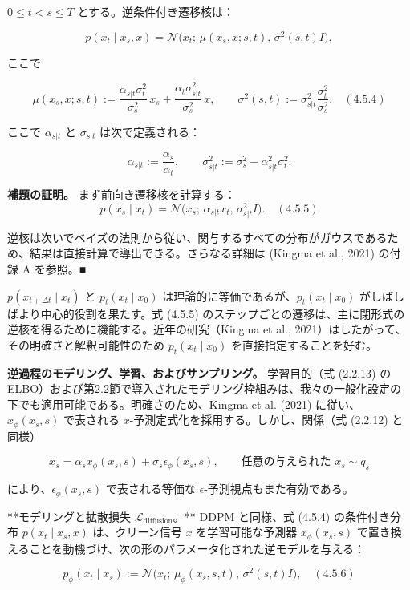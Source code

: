 \begin{propositionbox}[補題 4.5.2: 逆条件付き遷移核]
$0\le t<s\le T$ とする。逆条件付き遷移核は：

\[
p(x_t\mid x_s,x)=\mathcal{N}\bigl(x_t;\, \mu(x_s,x;s,t),\, \sigma^2(s,t)I\bigr),
\]

ここで

\[
\mu(x_s,x;s,t)
:=\frac{\alpha_{s|t}\sigma_t^2}{\sigma_s^2}\, x_s
+ \frac{\alpha_t\sigma_{s|t}^2}{\sigma_s^2}\, x, \qquad
\sigma^2(s,t):=\sigma_{s|t}^2\frac{\sigma_t^2}{\sigma_s^2}. \quad (4.5.4)
\]

ここで $\alpha_{s|t}$ と $\sigma_{s|t}$ は次で定義される：

\[
\alpha_{s|t}:=\frac{\alpha_s}{\alpha_t}, \qquad
\sigma_{s|t}^2:=\sigma_s^2-\alpha_{s|t}^2\sigma_t^2.
\]
\end{propositionbox}


\textbf{補題の証明。}
まず前向き遷移核を計算する：
\[
p(x_s\mid x_t)=\mathcal{N}\bigl(x_s;\, \alpha_{s|t}x_t,\, \sigma_{s|t}^2 I\bigr). \quad (4.5.5)
\]

逆核は次いでベイズの法則から従い、関与するすべての分布がガウスであるため、結果は直接計算で導出できる。さらなる詳細は (Kingma et al., 2021) の付録 A を参照。■

$p(x_{t+\Delta t}\mid x_t)$ と $p_t(x_t\mid x_0)$ は理論的に等価であるが、$p_t(x_t\mid x_0)$ がしばしばより中心的役割を果たす。式 (4.5.5) のステップごとの遷移は、主に閉形式の逆核を得るために機能する。近年の研究（Kingma et al., 2021）はしたがって、その明確さと解釈可能性のため $p_t(x_t\mid x_0)$ を直接指定することを好む。

\textbf{逆過程のモデリング、学習、およびサンプリング。} 学習目的（式 (2.2.13) の ELBO）および第2.2節で導入されたモデリング枠組みは、我々の一般化設定の下でも適用可能である。明確さのため、Kingma et al. (2021) に従い、$x_\phi(x_s,s)$ で表される $x$-予測定式化を採用する。しかし、関係（式 (2.2.12) と同様）

\[
x_s=\alpha_s x_\phi(x_s,s)+\sigma_s\epsilon_\phi(x_s,s), \qquad\text{任意の与えられた }x_s\sim q_s
\]


により、$\epsilon_\phi(x_s,s)$ で表される等価な $\epsilon$-予測視点もまた有効である。

**モデリングと拡散損失 $\mathcal{L}_{\mathrm{diffusion}}$。** DDPM と同様、式 (4.5.4) の条件付き分布 $p(x_t\mid x_s,x)$ は、クリーン信号 $x$ を学習可能な予測器 $x_\phi(x_s,s)$ で置き換えることを動機づけ、次の形のパラメータ化された逆モデルを与える：

\[
p_\phi(x_t\mid x_s):=\mathcal{N}\bigl(x_t;\, \mu_\phi(x_s,s,t),\, \sigma^2(s,t)I\bigr), \quad (4.5.6)
\]


